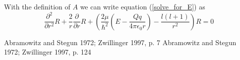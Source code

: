 \documentclass[12pt,a4paper]{report}
\begin{document}
	With the definition of $A$ we can write equation (\ref{solve_for_E}) as 
	\begin{equation}
		\frac{\partial^2}{\partial r^2}R+\frac{2}{r}\frac{\partial}{\partial r}R+\left(\frac{2\mu}{\hbar^2}\left(E-\frac{Qq}{4\pi\epsilon_0 r}\right)-\frac{l\left(l+1\right)}{r^2}\right)R=0
	\end{equation}

\begin{thebibliography}{10}
 Abramowitz and Stegun 1972; Zwillinger 1997, p. 7
 Abramowitz and Stegun 1972; Zwillinger 1997, p. 124

\end{thebibliography}
\end{document}
